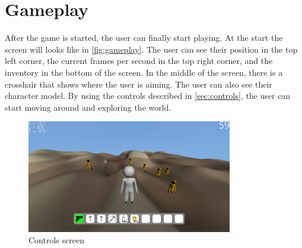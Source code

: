 \section{Gameplay}\label{sec:gameplay}
After the game is started, the user can finally start playing.
At the start the screen will looks like in \autoref{fig:gameplay}.
The user can see their position in the top left corner, the current frames per second in the top right corner, and the inventory in the bottom of the screen.
In the middle of the screen, there is a crosshair that shows where the user is aiming.
The user can also see their character model.
By using the controls described in \autoref{sec:controls}, the user can start moving around and exploring the world.


\begin{figure}[h]
    \centering
    \includegraphics[width=0.8\textwidth]{chapters/user_manual/resources/gameplay.png}
    \caption{Controls screen}
    \label{fig:gameplay}
\end{figure}